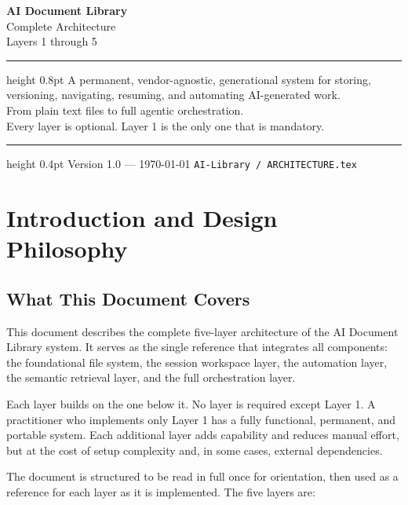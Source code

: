 \documentclass[12pt,letterpaper]{article}
\begin{document}
\begin{titlepage}
\centering
\vspace*{1in}
{\Huge\bfseries AI Document Library}\\[10pt]
{\Large Complete Architecture}\\[8pt]
{\large Layers 1 through 5}\\[20pt]
\hrule height 0.8pt
\vspace{14pt}
{\normalsize
A permanent, vendor-agnostic, generational system for storing,\\
versioning, navigating, resuming, and automating AI-generated work.\\[8pt]
From plain text files to full agentic orchestration.\\
Every layer is optional. Layer 1 is the only one that is mandatory.
}
\vspace{14pt}
\hrule height 0.4pt
\vspace{28pt}
{\small Version 1.0 \quad --- \quad \today}
\vfill
{\footnotesize\texttt{AI-Library / ARCHITECTURE.tex}}
\end{titlepage}

\newpage
\tableofcontents
\newpage

\section{Introduction and Design Philosophy}

\subsection{What This Document Covers}

This document describes the complete five-layer architecture of the AI Document
Library system. It serves as the single reference that integrates all components:
the foundational file system, the session workspace layer, the automation layer,
the semantic retrieval layer, and the full orchestration layer.

Each layer builds on the one below it. No layer is required except Layer 1.
A practitioner who implements only Layer 1 has a fully functional, permanent,
and portable system. Each additional layer adds capability and reduces manual
effort, but at the cost of setup complexity and, in some cases, external
dependencies.

The document is structured to be read in full once for orientation, then used
as a reference for each layer as it is implemented. The five layers are:
\end{document}

